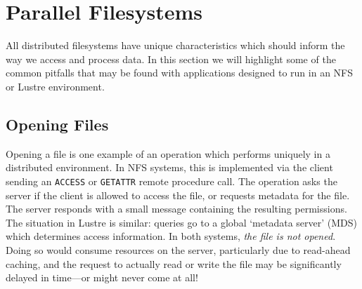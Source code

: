 % 

\section{Parallel Filesystems}\label{sec:parallel_fs}

All distributed filesystems have unique characteristics which should
inform the way we access and process data.  In this section we
will highlight some of the common pitfalls that may be found with
applications designed to run in an NFS or Lustre environment.

\subsection{Opening Files}

Opening a file is one example of an operation which performs uniquely
in a distributed environment.  In NFS systems, this is implemented
via the client sending an \verb!ACCESS! or \verb!GETATTR! remote
procedure call.  The operation asks the server if the client is allowed
to access the file, or requests metadata for the file.  The server
responds with a small message containing the resulting permissions.
The situation in Lustre is similar: queries go to a global `metadata
server' (MDS) which determines access information.  In both systems,
\emph{the file is not opened}.  Doing so would consume resources on
the server, particularly due to read-ahead caching, and the request
to actually read or write the file may be significantly delayed in
time---or might never come at all!

%

